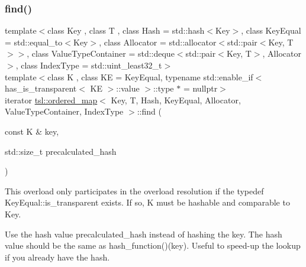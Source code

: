 \subsubsection{\texorpdfstring{find()}{find()}\hspace{0.1cm}{\footnotesize\ttfamily [4/6]}}
{\footnotesize\ttfamily template$<$class Key , class T , class Hash  = std\+::hash$<$\+Key$>$, class Key\+Equal  = std\+::equal\+\_\+to$<$\+Key$>$, class Allocator  = std\+::allocator$<$std\+::pair$<$\+Key, T$>$$>$, class Value\+Type\+Container  = std\+::deque$<$std\+::pair$<$\+Key, T$>$, Allocator$>$, class Index\+Type  = std\+::uint\+\_\+least32\+\_\+t$>$ \\
template$<$class K , class KE  = Key\+Equal, typename std\+::enable\+\_\+if$<$ has\+\_\+is\+\_\+transparent$<$ K\+E $>$\+::value $>$\+::type $\ast$  = nullptr$>$ \\
iterator \mbox{\hyperlink{classtsl_1_1ordered__map}{tsl\+::ordered\+\_\+map}}$<$ Key, T, Hash, Key\+Equal, Allocator, Value\+Type\+Container, Index\+Type $>$\+::find (\begin{DoxyParamCaption}\item[{const K \&}]{key,  }\item[{std\+::size\+\_\+t}]{precalculated\+\_\+hash }\end{DoxyParamCaption})\hspace{0.3cm}{\ttfamily [inline]}}





This overload only participates in the overload resolution if the typedef Key\+Equal\+::is\+\_\+transparent exists. If so, K must be hashable and comparable to Key.

Use the hash value \textquotesingle{}precalculated\+\_\+hash\textquotesingle{} instead of hashing the key. The hash value should be the same as hash\+\_\+function()(key). Useful to speed-\/up the lookup if you already have the hash. \mbox{\label{classtsl_1_1ordered__map_acc1fb65ec2b2b8680393044a811cfbd2}} 

